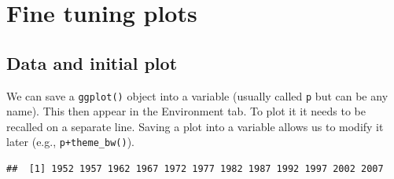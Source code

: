 \documentclass[]{book}
\makeatletter
\newenvironment{Shaded}{\begin{snugshade}}{\end{snugshade}}
\newcommand{\DataTypeTok}[1]{\textcolor[rgb]{0.13,0.29,0.53}{#1}}
\newcommand{\DecValTok}[1]{\textcolor[rgb]{0.00,0.00,0.81}{#1}}
\newcommand{\FloatTok}[1]{\textcolor[rgb]{0.00,0.00,0.81}{#1}}
\newcommand{\KeywordTok}[1]{\textcolor[rgb]{0.13,0.29,0.53}{\textbf{#1}}}
\newcommand{\NormalTok}[1]{#1}
\newcommand{\OperatorTok}[1]{\textcolor[rgb]{0.81,0.36,0.00}{\textbf{#1}}}
\newcommand{\OtherTok}[1]{\textcolor[rgb]{0.56,0.35,0.01}{#1}}
\newcommand{\StringTok}[1]{\textcolor[rgb]{0.31,0.60,0.02}{#1}}
\newenvironment{kframe}{%
\medskip{}
\setlength{\fboxsep}{.8em}
 \def\at@end@of@kframe{}%
 \ifinner\ifhmode%
  \def\at@end@of@kframe{\end{minipage}}%
  \begin{minipage}{\columnwidth}%
 \fi\fi%
 \def\FrameCommand##1{\hskip\@totalleftmargin \hskip-\fboxsep
 \colorbox{shadecolor}{##1}\hskip-\fboxsep
     \hskip-\linewidth \hskip-\@totalleftmargin \hskip\columnwidth}%
 \MakeFramed {\advance\hsize-\width
   \@totalleftmargin\z@ \linewidth\hsize
   \@setminipage}}%
 {\par\unskip\endMakeFramed%
 \at@end@of@kframe}
\renewenvironment{Shaded}{\begin{kframe}}{\end{kframe}}
\theoremstyle{definition}
\theoremstyle{definition}
\theoremstyle{definition}
\theoremstyle{remark}
\makeatother
\begin{document}
\hypertarget{fine-tuning-plots}{%
\chapter{Fine tuning plots}\label{fine-tuning-plots}}

\hypertarget{data-and-initial-plot}{%
\section{Data and initial plot}\label{data-and-initial-plot}}

We can save a \texttt{ggplot()} object into a variable (usually called
\texttt{p} but can be any name). This then appear in the Environment
tab. To plot it it needs to be recalled on a separate line. Saving a
plot into a variable allows us to modify it later (e.g.,
\texttt{p+theme\_bw()}).

\begin{Shaded}
\end{Shaded}

\begin{verbatim}
##  [1] 1952 1957 1962 1967 1972 1977 1982 1987 1992 1997 2002 2007
\end{verbatim}

\begin{Shaded}
\end{Shaded}
\end{document}
